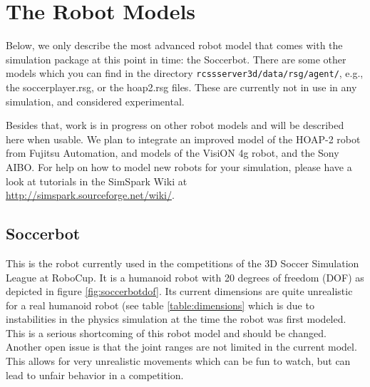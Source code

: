 \chapter{The Robot Models}
\label{cha:robots}


Below, we only describe the most advanced robot model that comes with the simulation package at this point in time: the Soccerbot. There are some other models which you can find in the directory \texttt{rcssserver3d/data/rsg/agent/}, e.g., the soccerplayer.rsg, or the hoap2.rsg files. These are currently not in use in any simulation, and considered experimental.

Besides that, work is in progress on other robot models and will be described here when usable. We plan to integrate an improved model of the HOAP-2 robot from Fujitsu Automation, and models of the VisiON 4g robot, and the Sony AIBO. For help on how to model new robots for your simulation, please have a look at tutorials in the SimSpark Wiki at \\

\url{http://simspark.sourceforge.net/wiki/}.

\section{Soccerbot}

This is the robot currently used in the competitions of the 3D Soccer Simulation League at RoboCup. It is a humanoid robot with 20 degrees of freedom (DOF) as depicted in figure \ref{fig:soccerbotdof}. Its current dimensions are quite unrealistic for a real humanoid robot (see table \ref{table:dimensions} which is due to instabilities in the physics simulation at the time the robot was first modeled. This is a serious shortcoming of this robot model and should be changed. Another open issue is that the joint ranges are not limited in the current model. This allows for very unrealistic movements which can be fun to watch, but can lead to unfair behavior in a competition.

